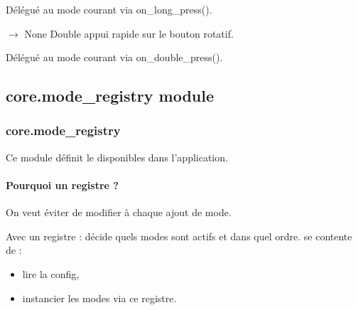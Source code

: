 \documentclass[letterpaper,10pt,french]{sphinxmanual}
\begin{document}
\begin{fulllineitems}
\begin{fulllineitems}
\sphinxAtStartPar
Délégué au mode courant via on\_long\_press().

\end{fulllineitems}


\begin{fulllineitems}
\label{\detokenize{api/core:core.mode_manager.ModeManager.handle_double_press}}
\pysigstartsignatures
\pysiglinewithargsret
{}
{}
{{ $\rightarrow$ None}}
\pysigstopsignatures
\sphinxAtStartPar
Double appui rapide sur le bouton rotatif.

\sphinxAtStartPar
Délégué au mode courant via on\_double\_press().

\end{fulllineitems}


\end{fulllineitems}



\subsection{core.mode\_registry module}
\label{\detokenize{api/core:module-core.mode_registry}}\label{\detokenize{api/core:core-mode-registry-module}}

\subsubsection{core.mode\_registry}
\label{\detokenize{api/core:core-mode-registry}}
\sphinxAtStartPar
Ce module définit le  disponibles dans l’application.


\paragraph{Pourquoi un registre ?}
\label{\detokenize{api/core:pourquoi-un-registre}}
\sphinxAtStartPar
On veut éviter de modifier  à chaque ajout de mode.

\sphinxAtStartPar
Avec un registre :
\sphinxhyphen{}  décide quels modes sont actifs et dans quel ordre.
\sphinxhyphen{}  se contente de :
\begin{itemize}
\item {} 
\sphinxAtStartPar
lire la config,

\item {} 
\sphinxAtStartPar
instancier les modes via ce registre.

\end{itemize}
\end{document}
